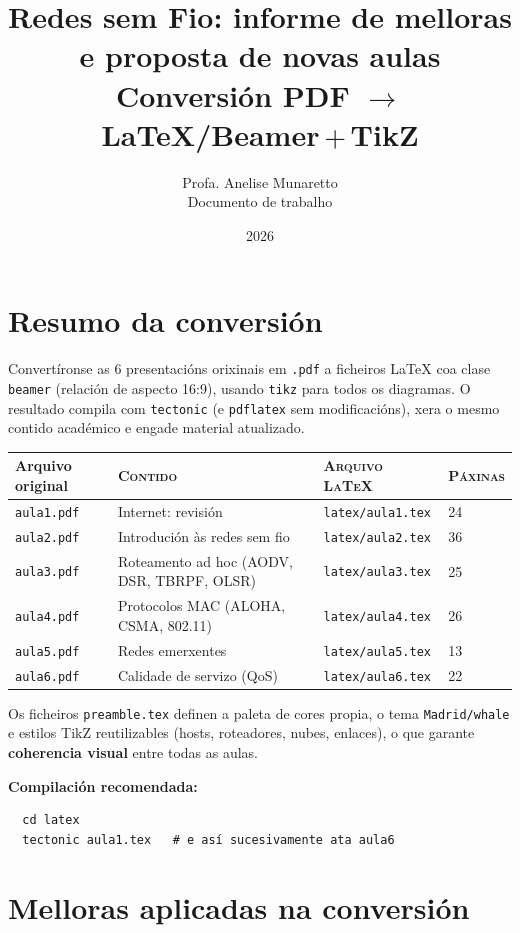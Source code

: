 \documentclass[11pt,a4paper]{article}
\title{Redes sem Fio: informe de melloras e proposta de novas aulas\\
\large Conversión  PDF $\rightarrow$ \LaTeX/Beamer\,$+$\,TikZ}
\author{Profa. Anelise Munaretto \\ \small Documento de trabalho}
\date{2026}
\begin{document}
\maketitle

\section{Resumo da conversión}

Convertíronse as 6 presentacións orixinais em \texttt{.pdf} a ficheiros
\LaTeX{} coa clase \texttt{beamer} (relación de aspecto 16:9), usando \texttt{tikz}
para todos os diagramas. O resultado compila com \texttt{tectonic} (e \texttt{pdflatex}
sem modificacións), xera o mesmo contido académico e engade material atualizado.

\begin{center}
\small
\begin{tabular}{@{}llll@{}}
\toprule
\textbf{Arquivo original} & \textsc{Contido} & \textsc{Arquivo LaTeX} & \textsc{Páxinas}\\
\midrule
\texttt{aula1.pdf} & Internet: revisión & \texttt{latex/aula1.tex} & 24\\
\texttt{aula2.pdf} & Introdución às redes sem fio & \texttt{latex/aula2.tex} & 36\\
\texttt{aula3.pdf} & Roteamento ad hoc (AODV, DSR, TBRPF, OLSR) & \texttt{latex/aula3.tex} & 25\\
\texttt{aula4.pdf} & Protocolos MAC (ALOHA, CSMA, 802.11) & \texttt{latex/aula4.tex} & 26\\
\texttt{aula5.pdf} & Redes emerxentes & \texttt{latex/aula5.tex} & 13\\
\texttt{aula6.pdf} & Calidade de servizo (QoS) & \texttt{latex/aula6.tex} & 22\\
\bottomrule
\end{tabular}
\end{center}

Os ficheiros \texttt{preamble.tex} definen a paleta de cores propia, o tema
\texttt{Madrid/whale} e estilos TikZ reutilizables (hosts, roteadores, nubes,
enlaces), o que garante \textbf{coherencia visual} entre todas as aulas.

\textbf{Compilación recomendada:}
\begin{verbatim}
  cd latex
  tectonic aula1.tex   # e así sucesivamente ata aula6
\end{verbatim}

\section{Melloras aplicadas na conversión}
\end{document}
